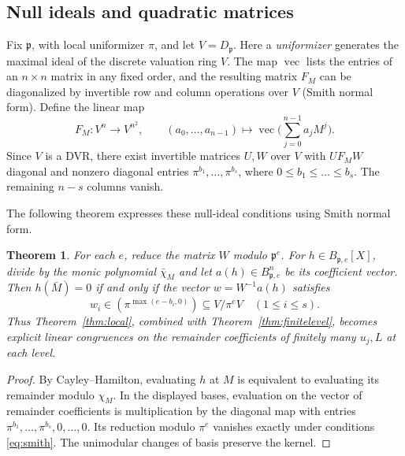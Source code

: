 \documentclass[11pt]{amsart}
\newtheorem{theorem}{Theorem}[section]
\theoremstyle{definition}
\theoremstyle{remark}
\begin{document}
\subsection{Null ideals and quadratic matrices}
Fix $\mathfrak p$, with local uniformizer $\pi$, and let $V=D_{\mathfrak p}$.
Here a \emph{uniformizer} generates the maximal ideal of the discrete
valuation ring $V$. The map $\operatorname{vec}$ lists the entries of
an $n\times n$ matrix in any fixed order, and the resulting matrix
$F_M$ can be diagonalized by invertible row and column operations
over $V$ (Smith normal form).
Define the linear map
\[
F_M: V^n\longrightarrow V^{n^2},\qquad
(a_0,\dots,a_{n-1})\longmapsto
\operatorname{vec}\bigl(\sum_{j=0}^{n-1}a_jM^j\bigr).
\]
Since $V$ is a DVR, there exist invertible matrices $U,W$ over $V$
with $UF_MW$ diagonal and nonzero diagonal entries
$\pi^{b_1},\ldots,\pi^{b_s}$, where
$0\le b_1\le\dots\le b_s$.
The remaining $n-s$ columns vanish.


The following theorem expresses these null-ideal conditions using Smith normal form.
\begin{theorem}\label{thm:smith}
For each $e$, reduce the matrix $W$ modulo $\mathfrak p^e$.
For $h\in B_{\mathfrak p,e}[X]$, divide by the monic polynomial
$\bar\chi_M$ and let $a(h)\in B_{\mathfrak p,e}^n$ be its coefficient vector.
Then $h(\bar M)=0$ if and only if the vector
$w=W^{-1}a(h)$ satisfies
\begin{equation}\label{eq:smith}
w_i\in(\pi^{\max(e-b_i,0)})\subseteq V/\pi^eV
\quad(1\le i\le s).
\end{equation}
Thus Theorem~\ref{thm:local}, combined with
Theorem~\ref{thm:finitelevel}, becomes explicit linear congruences
on the remainder coefficients of finitely many $u_j,L$ at each level.
\end{theorem}
\begin{proof}
By Cayley--Hamilton, evaluating $h$ at $M$ is equivalent to evaluating
its remainder modulo $\chi_M$. In the displayed bases, evaluation on the
vector of remainder coefficients is multiplication by the diagonal map
with entries $\pi^{b_1},\ldots,\pi^{b_s},0,\ldots,0$.
Its reduction modulo $\pi^e$ vanishes exactly under conditions
\eqref{eq:smith}. The unimodular changes of basis preserve the kernel.
\end{proof}
\end{document}
